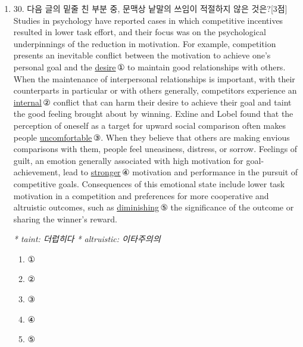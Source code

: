 \documentclass{article}
\begin{document}
\begin{enumerate}[label=\textbf{Q\arabic*.}]
\textit{* crude: 무뚝한}

\begin{enumerate}
  \item ①
  \item ②
  \item ③
  \item ④
  \item ⑤
\end{enumerate}

\item
30. 다음 글의 밑줄 친 부분 중, 문맥상 낱말의 쓰임이 적절하지 않은 것은?[3점]
\\
Studies in psychology have reported cases in which competitive incentives resulted in lower task effort, and their focus was on the psychological underpinnings of the reduction in motivation. For example, competition presents an inevitable conflict between the motivation to achieve one’s personal goal and the \underline{desire}\,① to maintain good relationships with others. When the maintenance of interpersonal relationships is important, with their counterparts in particular or with others generally, competitors experience an \underline{internal}\,② conflict that can harm their desire to achieve their goal and taint the good feeling brought about by winning. Exline and Lobel found that the perception of oneself as a target for upward social comparison often makes people \underline{uncomfortable}\,③. When they believe that others are making envious comparisons with them, people feel uneasiness, distress, or sorrow. Feelings of guilt, an emotion generally associated with high motivation for goal-achievement, lead to \underline{stronger}\,④ motivation and performance in the pursuit of competitive goals. Consequences of this emotional state include lower task motivation in a competition and preferences for more cooperative and altruistic outcomes, such as \underline{diminishing}\,⑤ the significance of the outcome or sharing the winner’s reward.

\textit{* taint: 더럽히다 \quad ** altruistic: 이타주의의}

\begin{enumerate}
  \item ①
  \item ②
  \item ③
  \item ④
  \item ⑤
\end{enumerate}


\end{enumerate}
\end{document}
